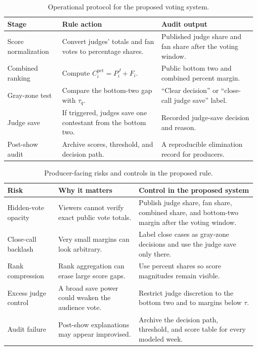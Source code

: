 \documentclass[12pt]{article}
\begin{document}
\begin{table}[H]
  \centering
  \caption{Operational protocol for the proposed voting system.}
  \label{tab:implementation}
  \begin{tabularx}{0.96\linewidth}{lXX}
    \toprule
    Stage & Rule action & Audit output \\
    \midrule
    Score normalization & Convert judges' totals and fan votes to percentage
    shares. & Published judge share and fan share after the voting window. \\
    Combined ranking & Compute $C_i^{\mathrm{pct}}=P_i^J+F_i$. & Public bottom
    two and combined percent margin. \\
    Gray-zone test & Compare the bottom-two gap with $\tau_q$. & ``Clear
    decision'' or ``close-call judge save'' label. \\
    Judge save & If triggered, judges save one contestant from the bottom two. &
    Recorded judge-save decision and reason. \\
    Post-show audit & Archive scores, threshold, and decision path. & A
    reproducible elimination record for producers. \\
    \bottomrule
  \end{tabularx}
\end{table}

\begin{table}[H]
  \centering
  \caption{Producer-facing risks and controls in the proposed rule.}
  \label{tab:risk-controls}
  \begin{tabularx}{0.96\linewidth}{lXX}
    \toprule
    Risk & Why it matters & Control in the proposed system \\
    \midrule
    Hidden-vote opacity & Viewers cannot verify exact public vote totals. &
    Publish judge share, fan share, combined share, and bottom-two margin after
    the voting window. \\
    Close-call backlash & Very small margins can look arbitrary. & Label
    close cases as gray-zone decisions and use the judge save only there. \\
    Rank compression & Rank aggregation can erase large score gaps. & Use
    percent shares so score magnitudes remain visible. \\
    Excess judge control & A broad save power could weaken the audience vote. &
    Restrict judge discretion to the bottom two and to margins below $\tau$. \\
    Audit failure & Post-show explanations may appear improvised. & Archive
    the decision path, threshold, and score table for every modeled week. \\
    \bottomrule
  \end{tabularx}
\end{table}
\end{document}
